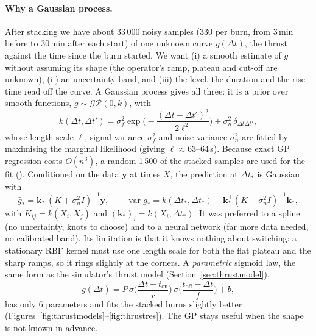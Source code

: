 \documentclass[11pt,a4paper]{article}
\newcommand{\code}[1]{\texttt{\detokenize{#1}}}
\begin{document}
\paragraph{Why a Gaussian process.} After stacking we have about 33\,000 noisy samples (330 per burn, from 3\,min
before to 30\,min after each start) of one unknown curve
$g(\Delta t)$, the thrust against the time since the burn started. We want (i) a smooth estimate of $g$ without assuming
its shape (the operator's ramp, plateau and cut-off are unknown), (ii) an uncertainty band, and (iii) the level, the
duration and the rise time read off the curve. A Gaussian process \cite{rasmussen} gives all three: it is a prior over
smooth functions, $g \sim \mathcal{GP}(0, k)$, with
\begin{equation}
  k(\Delta t, \Delta t') = \sigma_f^2\exp\!\Big(-\frac{(\Delta t-\Delta t')^2}{2\ell^2}\Big) + \sigma_n^2\,\delta_{\Delta t\Delta t'},
\end{equation}
whose length scale $\ell$, signal variance $\sigma_f^2$ and noise variance $\sigma_n^2$ are fitted by maximising the
marginal likelihood (giving $\ell \approx 63$--$64$\,s). Because exact GP regression costs $O(n^3)$, a random 1\,500 of the
stacked samples are used for the fit (\code{GP_MAX_POINTS}). Conditioned on the data $\mathbf y$ at times $X$, the prediction at
$\Delta t_*$ is Gaussian with
\begin{equation}
  \bar g_* = \mathbf k_*^\top (K + \sigma_n^2 I)^{-1}\mathbf y,\qquad
  \operatorname{var} g_* = k(\Delta t_*,\Delta t_*) - \mathbf k_*^\top (K + \sigma_n^2 I)^{-1}\mathbf k_*,
\end{equation}
with $K_{ij} = k(X_i,X_j)$ and $(\mathbf k_*)_i = k(X_i,\Delta t_*)$. It was preferred to a spline (no uncertainty, knots
to choose) and to a neural network (far more data needed, no calibrated band). Its limitation is that it knows nothing
about switching: a stationary RBF kernel must use one length scale for both the flat plateau and the sharp ramps, so it
rings slightly at the corners. A \emph{parametric} sigmoid law, the same form as the simulator's thrust model
(Section~\ref{sec:thrustmodel}),
\begin{equation}
  g(\Delta t) = P\,\sigma\!\Big(\frac{\Delta t - t_{\text{on}}}{r}\Big)\,\sigma\!\Big(\frac{t_{\text{off}} - \Delta t}{f}\Big) + b,
\end{equation}
has only 6 parameters and fits the stacked burns slightly better (Figures~\ref{fig:thrustmodels}--\ref{fig:thrustres}).
The GP stays useful when the shape is not known in advance.
\end{document}
